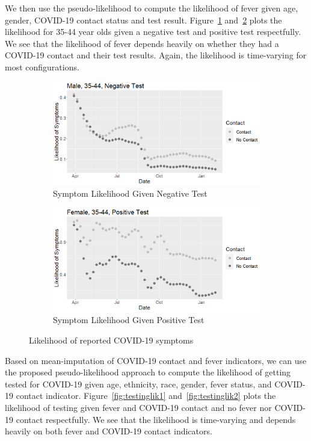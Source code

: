 \documentclass[12pt]{amsart}
\numberwithin{equation}{section}
\theoremstyle{plain}
\begin{document}
We then use the pseudo-likelihood to compute the likelihood of fever given age, gender, COVID-19 contact status and test result.  Figure~\ref{fig:symptomlik1} and~\ref{fig:symptomlik2} plots the likelihood for 35-44 year olds given a negative test and positive test respectfully.  We see that the likelihood of fever depends heavily on whether they had a COVID-19 contact and their test results. Again, the likelihood is time-varying for most configurations.


\begin{figure}[!th]
\centering
\begin{subfigure}{.5\textwidth}
 \centering
 \includegraphics[width=.9\linewidth]{../figs/tvprop_symptom_fig1.png}
 \caption{Symptom Likelihood Given Negative Test}
 \label{fig:symptomlik1}
\end{subfigure}%
\begin{subfigure}{.5\textwidth}
 \centering
\includegraphics[width=.9\linewidth]{../figs/tvprop_symptom_fig2.png}
 \caption{Symptom Likelihood Given Positive Test}
 \label{fig:symptomlik2}
\end{subfigure}
\caption{Likelihood of reported COVID-19 symptoms}
\label{fig:symptomlik}
\end{figure}

Based on mean-imputation of COVID-19 contact and fever indicators, we can use the proposed pseudo-likelihood approach to compute the likelihood of getting tested for COVID-19 given age, ethnicity, race, gender, fever status, and COVID-19 contact indicator.  Figure~\ref{fig:testinglik1} and~\ref{fig:testinglik2} plots the likelihood of testing given fever and COVID-19 contact and no fever nor COVID-19 contact respectfully.  We see that the likelihood is time-varying and depends heavily on both fever and COVID-19 contact indicators.
\end{document}
